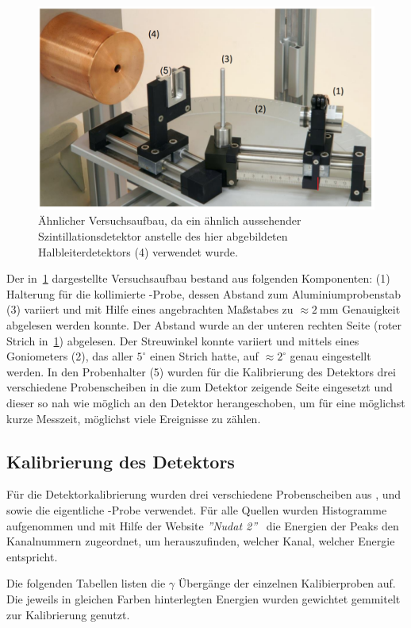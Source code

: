 \documentclass[draft, slug=CS, room=Andreas-Schubert-Bau\,\ Labor\ 406,
supervisor=Juliane\ Volkmer, coursedate=29.\ 11.\ 2019]{../../Lab_Report_LaTeX/lab_report}
\newcommand{\am}{\ce{^241Am}}
\begin{document}
\begin{figure}[H]\centering
        \includegraphics[width=.7\columnwidth]{./pictures/versuchsaufbau.png}
        \caption{Ähnlicher Versuchsaufbau, da ein ähnlich aussehender Szintillationsdetektor anstelle
                des hier abgebildeten Halbleiterdetektors (4) verwendet wurde.}
        \label{fig:versuchsaufbau}
\end{figure}

Der in~\ref{fig:versuchsaufbau} dargestellte Versuchsaufbau bestand aus folgenden Komponenten:
(1) Halterung für die kollimierte \am{}-Probe, dessen Abstand zum Aluminiumprobenstab (3)
variiert und mit Hilfe eines angebrachten Maßstabes zu \(\approx \SI{2}{\milli\metre}\)
Genauigkeit abgelesen werden konnte. Der Abstand wurde an der unteren rechten Seite (roter Strich
in~\ref{fig:versuchsaufbau}) abgelesen. Der Streuwinkel konnte variiert und mittels eines
Goniometers (2), das aller \(5^\circ\) einen Strich hatte, auf \(\approx 2^\circ\) genau
eingestellt werden. In den Probenhalter (5) wurden für die Kalibrierung des Detektors drei
verschiedene Probenscheiben in die zum Detektor zeigende Seite eingesetzt und dieser so nah wie
möglich an den Detektor herangeschoben, um für eine möglichst kurze Messzeit, möglichst viele Ereignisse zu zählen.

\subsection{Kalibrierung des Detektors}
\label{sec:kalib}

Für die Detektorkalibrierung wurden drei verschiedene Probenscheiben aus ,
 und  sowie die eigentliche \am{}-Probe verwendet.
Für alle Quellen wurden Histogramme aufgenommen und mit Hilfe der Website \emph{''Nudat 2''}~\cite{nudat}
die Energien der Peaks den Kanalnummern zugeordnet, um herauszufinden, welcher Kanal, welcher
Energie entspricht.

Die folgenden Tabellen listen die \(\gamma\) \"Uberg\"ange der
einzelnen Kalibierproben auf. Die jeweils in gleichen Farben
hinterlegten Energien wurden gewichtet gemmitelt zur Kalibrierung genutzt.
\end{document}
